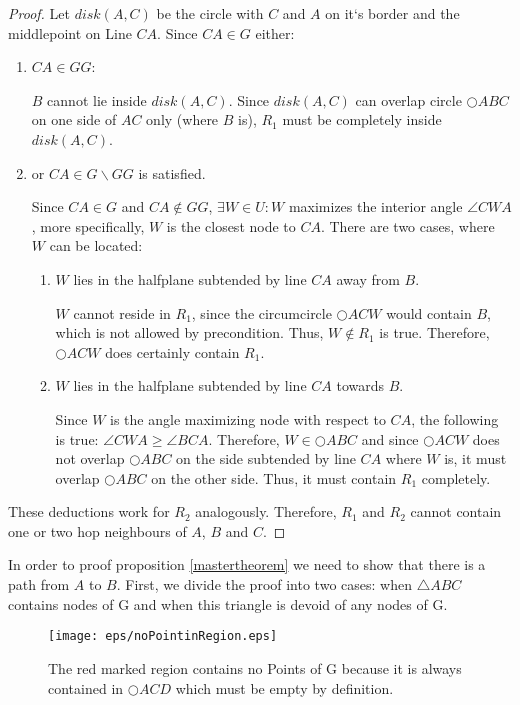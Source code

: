 \begin{proof}
Let $disk(A, C) $ be the circle with $C $ and $A $ on it`s border and the middlepoint on Line $CA $.
Since $CA \in G $ either: 
\begin{enumerate}
\renewcommand{\labelenumi}{(\roman{enumi})}
\item $CA \in GG $:

$B $ cannot lie inside $disk(A, C) $. 
Since $disk(A, C) $ can overlap circle $\bigcirc{ABC} $ on one side of $AC $ only (where $B $ is), $R_1 $ must be completely inside $disk(A, C) $.
\item or $CA \in G\backslash GG $ is satisfied. 

Since $CA \in G $ and $CA \notin GG $, $\exists W\in U : W$ maximizes the interior angle $\angle{CWA}  $, more specifically, $W $ is the closest node to $CA $.
There are two cases, where $W $ can be located:
\begin{enumerate}
\renewcommand{\labelenumi}{(\alph{enumi})}
\item $W $ lies in the halfplane subtended by line $CA $ away from $B $.

$W $ cannot reside in $R_1 $, since the circumcircle $\bigcirc{ACW} $ would contain $B $, which is not allowed by precondition.
Thus, $W \notin R_1 $ is true.
Therefore, $\bigcirc{ACW} $ does certainly contain $R_1 $.

\item $W $ lies in the halfplane subtended by line $CA $ towards $B $.

Since $W $ is the angle maximizing node with respect to $CA $, the following is true: $\angle{CWA} \geq \angle{BCA} $.
Therefore, $W \in \bigcirc{ABC} $ and since $\bigcirc{ACW} $ does not overlap $\bigcirc{ABC} $ on the side subtended by line $CA $ where $W $ is, it must overlap $\bigcirc{ABC} $ on the other side.
Thus, it must contain $R_1 $ completely.

\end{enumerate} 


\end{enumerate}
These deductions work for $R_2 $ analogously.
Therefore, $R_1 $ and $R_2 $ cannot contain one or two hop neighbours of $A $, $B $ and $C $. 


\end{proof} 



In order to proof proposition \ref{mastertheorem} we need to show that there is a path from $A $ to $B $.
First, we divide the proof into two cases: when $\triangle{ABC} $ contains nodes of G and when this triangle is devoid of any nodes of G.
\begin{figure}[h!]
\centering
\texttt{[image: eps/noPointinRegion.eps]}
\caption{The red marked region contains no Points of G because it is always contained in $\bigcirc{ACD} $ which must be empty by definition.}
\label{fig:empty_region}
\end{figure}

